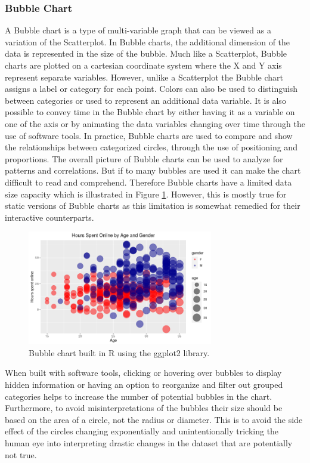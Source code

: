 \subsubsection{Bubble Chart}
A Bubble chart is a type of multi-variable graph that can be viewed as a variation 
of the Scatterplot. In Bubble charts, the additional dimension of the data is represented 
in the size of the bubble. Much like a Scatterplot, Bubble charts are plotted on 
a cartesian coordinate system where the X and Y axis represent separate variables. 
However, unlike a Scatterplot the Bubble chart assigns a label or category for
each point. Colors can also be used to distinguish between categories or used to 
represent an additional data variable. It is also possible to convey time in the
Bubble chart by either having it as a variable on one of the axis or by animating 
the data variables changing over time through the use of software tools. In practice,
Bubble charts are used to compare and show the relationships between categorized 
circles, through the use of positioning and proportions. The overall picture of 
Bubble charts can be used to analyze for patterns and correlations. But if to many bubbles 
are used it can make the chart difficult to read and comprehend. Therefore Bubble 
charts have a limited data size capacity which is illustrated in Figure \ref{figure:bubble_chart}.  
However, this is mostly true for static versions of Bubble charts as this limitation 
is somewhat remedied for their interactive counterparts. 

\begin{figure}[!ht]
    \centering
    \includegraphics[height=5cm]{figures/bubble_chart.png}
    \caption{Bubble chart built in R using the ggplot2 library.}
    \label{figure:bubble_chart}
\end{figure} 

When built with software tools, clicking or hovering over bubbles to display hidden 
information or having an option to reorganize and filter out grouped categories 
helps to increase the number of potential bubbles in the chart. Furthermore, to 
avoid misinterpretations of the bubbles their size should be based on the area of 
a circle, not the radius or diameter. This is to avoid the side effect of the circles 
changing exponentially and unintentionally tricking the human eye into interpreting 
drastic changes in the dataset that are potentially not true.

